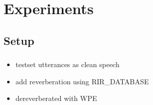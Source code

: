 \documentclass{beamer}
\DeclareMathOperator*{\argmin}{arg\,min}
\begin{document}
%
%   
%
%  
%  
%  
%   
%  
%
%  
%   
%  
%

\section{Experiments}
\subsection{Setup}
\frame
{
  \frametitle{\subsecname}
  
  \begin{itemize}
    \item testset utterances as clean speech
    
    \item add reverberation using RIR\_DATABASE
    
    \item dereverberated with WPE
  \end{itemize}
}
\end{document}
